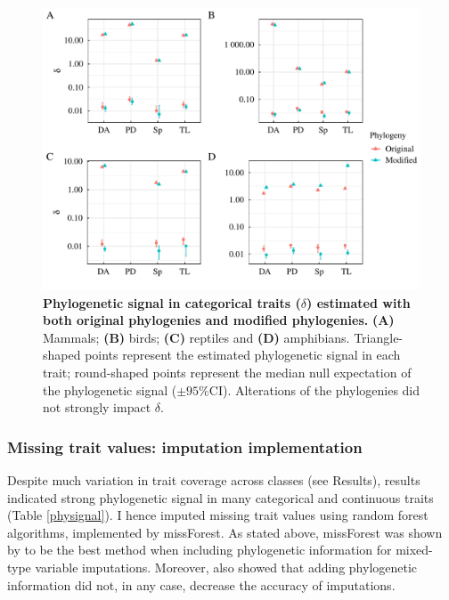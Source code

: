\begin{figure}[h!]
\centering
\includegraphics[scale=0.5]{figures/chapter2/Phylosignal/Categorical}
\caption[Phylogenetic signal in categorical traits ($\delta$) estimated with both original phylogenies and modified phylogenies]{\textbf{Phylogenetic signal in categorical traits ($\delta$) estimated with both original phylogenies and modified phylogenies.} \textbf{(A)} Mammals; \textbf{(B)} birds; \textbf{(C)} reptiles and \textbf{(D)} amphibians. Triangle-shaped points represent the estimated phylogenetic signal in each trait; round-shaped points represent the median null expectation of the phylogenetic signal ($\pm95\%$CI). Alterations of the phylogenies did not strongly impact $\delta$.}
\label{signalcategorical}
\end{figure}

\pagebreak


\subsubsection{Missing trait values: imputation implementation}
Despite much variation in trait coverage across classes (see Results), results indicated strong phylogenetic signal in many categorical and continuous traits (Table \ref{physignal}). 
I hence imputed missing trait values using random forest algorithms, implemented by missForest. As stated above, missForest was shown by \citet{Penone2014} to be the best method when including phylogenetic information for mixed-type variable imputations. Moreover, \citet{Penone2014} also showed that adding phylogenetic information did not, in any case, decrease the accuracy of imputations. 

